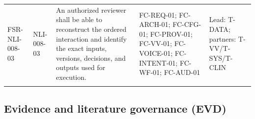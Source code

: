 \documentclass[11pt,letterpaper]{article}
\begin{document}
\begin{scriptsize}
\begin{longtable}{@{}L{0.16\textwidth}L{0.10\textwidth}L{0.31\textwidth}L{0.23\textwidth}L{0.125\textwidth}@{}}
\addlinespace[2pt]
\mbox{FSR-NLI-008-03} & \mbox{NLI-008-03} & An authorized reviewer shall be able to reconstruct the ordered interaction and identify the exact inputs, versions, decisions, and outputs used for execution. & FC-REQ-01; FC-ARCH-01; FC-CFG-01; FC-PROV-01; FC-VV-01; FC-VOICE-01; FC-INTENT-01; FC-WF-01; FC-AUD-01 & Lead: T-DATA; partners: T-VV\slash\allowbreak{}T-SYS\slash\allowbreak{}T-CLIN \\
\addlinespace[2pt]
\end{longtable}
\end{scriptsize}

\subsection{Evidence and literature governance (EVD)}
\end{document}
